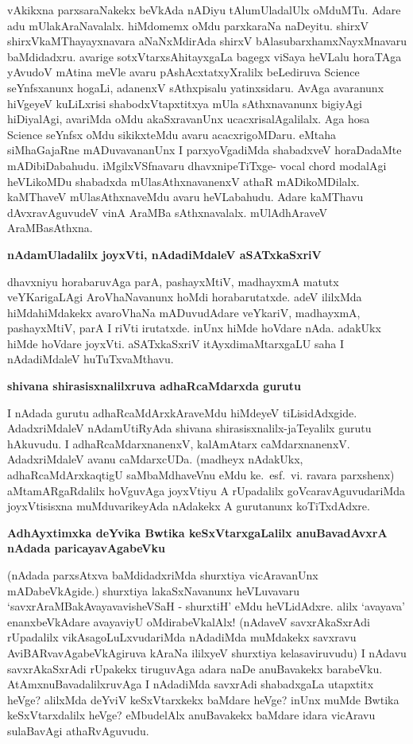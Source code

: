 \noindent
vAkikxna parxsaraNakekx beVkAda nADiyu tAlumUladalUlx oMduMTu. Adare adu mUlakAraNavalalx. hiMdomemx oMdu parxkaraNa naDeyitu. shirxV shirxVkaMThayayxnavara aNaNxMdirAda shirxV bAlasubarxhamxNayxMnavaru baMdidadxru. avarige sotxVtarxsAhitayxgaLa bagegx viSaya heVLalu horaTAga yAvudoV mAtina meVle avaru pAshAcxtatxyXralilx beLediruva {\rm Science} seYnfsxanunx hogaLi, adanenxV sAthxpisalu yatinxsidaru. AvAga avaranunx hiVgeyeV kuLiLxrisi shabodxVtapxtitxya mUla sAthxnavanunx bigiyAgi hiDiyalAgi, avariMda oMdu akaSxravanUnx ucacxrisalAgalilalx. Aga hosa {\rm Science} seYnfsx oMdu sikikxteMdu avaru acacxrigoMDaru. eMtaha siMhaGajaRne mADuvavananUnx I parxyoVgadiMda shabadxveV horaDadaMte mADibiDabahudu. iMgilxVSfnavaru dhavxnipeTiTxge- {\rm vocal chord} modalAgi heVLikoMDu shabadxda mUlasAthxnavanenxV athaR mADikoMDilalx. kaMThaveV mUlasAthxnaveMdu avaru heVLabahudu. Adare kaMThavu dAvxravAguvudeV vinA AraMBa sAthxnavalalx. mUlAdhAraveV AraMBasAthxna. 

{\bigskip
\noindent
{\large\bf nAdamUladalilx joyxVti, nAdadiMdaleV aSATxkaSxriV}}\label{page172}
\medskip

\noindent
dhavxniyu horabaruvAga parA, pashayxMtiV, madhayxmA matutx veYKarigaLAgi AroVhaNavanunx hoMdi horabarutatxde. adeV ililxMda hiMdahiMdakekx avaroVhaNa mADuvudAdare veYkariV, madhayxmA, pashayxMtiV, parA I riVti irutatxde. inUnx hiMde hoVdare nAda. adakUkx hiMde hoVdare joyxVti. aSATxkaSxriV itAyxdimaMtarxgaLU saha I nAdadiMdaleV huTuTxvaMthavu.

{\bigskip
\noindent
{\large\bf shivana shirasisxnalilxruva adhaRcaMdarxda gurutu}}\label{page172a}
\medskip

\noindent
I nAdada gurutu adhaRcaMdArxkAraveMdu hiMdeyeV tiLisidAdxgide. AdadxriMdaleV nAdamUtiRyAda shivana shirasisxnalilx-jaTeyalilx gurutu hAkuvudu. I adhaRcaMdarxnanenxV, kalAmAtarx caMdarxnanenxV. AdadxriMdaleV avanu caMdarxcUDa. (madheyx nAdakUkx, adhaRcaMdArxkaqtigU saMbaMdhaveVnu eMdu ke.~esf.~vi. ravara parxshenx) aMtamARgaRdalilx hoVguvAga joyxVtiyu A rUpadalilx goVcaravAguvudariMda joyxVtisisxna muMduvarikeyAda nAdakekx A gurutanunx koTiTxdAdxre.

{\bigskip
\noindent
{\large\bf AdhAyxtimxka deYvika Bwtika keSxVtarxgaLalilx anuBavadAvxrA nAdada paricayavAgabeVku}}\label{page172b}
\medskip

\noindent
(nAdada parxsAtxva baMdidadxriMda shurxtiya vicAravanUnx mADabeVkAgide.) shurxtiya lakaSxNavanunx heVLuvavaru `savxrAraMBakAvayavavisheVSaH\label{172} - shurxtiH' eMdu heVLidAdxre. alilx `avayava' enanxbeVkAdare avayaviyU oMdirabeVkalAlx! (nAdaveV savxrAkaSxrAdi rUpadalilx vikAsagoLuLxvudariMda nAdadiMda muMdakekx savxravu AviBARvavAgabeVkAgiruva kAraNa ililxyeV shurxtiya kelasaviruvudu) I nAdavu savxrAkaSxrAdi rUpakekx tiruguvAga adara naDe anuBavakekx barabeVku. AtAmxnuBavadalilxruvAga I nAdadiMda savxrAdi shabadxgaLa utapxtitx heVge? alilxMda deYviV keSxVtarxkekx baMdare heVge? inUnx muMde Bwtika keSxVtarxdalilx heVge? eMbudelAlx anuBavakekx baMdare idara vicAravu sulaBavAgi athaRvAguvudu.

